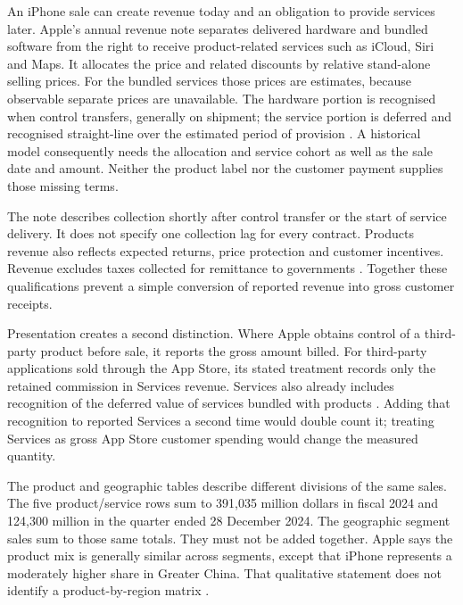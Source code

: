 An iPhone sale can create revenue today and an obligation to provide services
later. Apple's annual revenue note separates delivered hardware and bundled
software from the right to receive product-related services such as iCloud,
Siri and Maps. It allocates the price and related discounts by relative
stand-alone selling prices. For the bundled services those prices are estimates,
because observable separate prices are unavailable. The hardware portion is
recognised when control transfers, generally on shipment; the service portion
is deferred and recognised straight-line over the estimated period of provision
\citep[Note 2, printed p.~35]{apple2024}. A historical model consequently needs
the allocation and service cohort as well as the sale date and amount. Neither
the product label nor the customer payment supplies those missing terms.

The note describes collection shortly after control transfer or the start of
service delivery. It does not specify one collection lag for every contract.
Products revenue also reflects expected returns, price protection and customer
incentives. Revenue excludes taxes collected for remittance to governments
\citep[Notes 1--2, printed pp.~34--35]{apple2024}. Together these qualifications
prevent a simple conversion of reported revenue into gross customer receipts.

Presentation creates a second distinction. Where Apple obtains control of a
third-party product before sale, it reports the gross amount billed. For
third-party applications sold through the App Store, its stated treatment
records only the retained commission in Services revenue. Services also already
includes recognition of the deferred value of services bundled with products
\citep[Note 2, printed p.~35]{apple2024}. Adding that recognition to reported
Services a second time would double count it; treating Services as gross App
Store customer spending would change the measured quantity.

The product and geographic tables describe different divisions of the same
sales. The five product/service rows sum to 391,035 million dollars in fiscal
2024 and 124,300 million in the quarter ended 28 December 2024. The geographic
segment sales sum to those same totals. They must not be added together.
Apple says the product mix is generally similar across segments, except that
iPhone represents a moderately higher share in Greater China. That qualitative
statement does not identify a product-by-region matrix
\citep[Notes 2 and 13, printed pp.~35--36 and 46--47]{apple2024}
\citep[Notes 2 and 10, printed pp.~6 and 11]{apple2025q1}.

